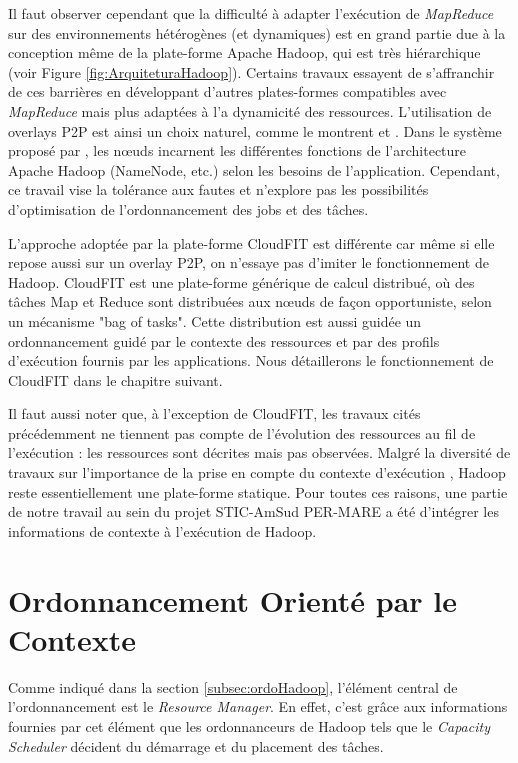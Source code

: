 Il faut observer cependant que la difficulté à adapter l'exécution de \textit{MapReduce} sur des environnements hétérogènes (et dynamiques) est en grand partie due à la conception même de la plate-forme Apache Hadoop, qui est très hiérarchique (voir Figure \ref{fig:ArquiteturaHadoop}). Certains travaux essayent de s'affranchir de ces barrières en développant d'autres plates-formes compatibles avec \textit{MapReduce} mais plus adaptées à l'a dynamicité des ressources.  L'utilisation de overlays P2P est ainsi un choix naturel, comme le montrent \cite{Marozzo2012} et \cite{Steffenel20151034}. Dans le système proposé par \cite{Marozzo2012}, les n{\oe}uds incarnent les différentes fonctions de l'architecture Apache Hadoop (NameNode, etc.) selon les besoins de l'application. Cependant, ce travail vise la tolérance aux fautes et n'explore pas les possibilités d'optimisation de l'ordonnancement des jobs et des tâches. 

L'approche adoptée par la plate-forme CloudFIT \cite{Steffenel20151034} est différente car même si elle repose aussi sur un overlay P2P, on n'essaye pas d'imiter le fonctionnement de Hadoop. CloudFIT est une plate-forme générique de calcul distribué, où des tâches Map et Reduce sont distribuées aux n{\oe}uds de façon opportuniste, selon un mécanisme "bag of tasks". Cette distribution est aussi guidée un ordonnancement guidé par le contexte des ressources et par des profils d'exécution fournis par les applications. Nous détaillerons le fonctionnement de CloudFIT dans le chapitre suivant.

Il faut aussi noter que, à l'exception de CloudFIT, les travaux cités précédemment ne tiennent pas compte de l'évolution des ressources au fil de l'exécution : les ressources sont décrites mais pas observées. Malgré la diversité de travaux sur l'importance de la prise en compte du contexte d'exécution \cite{Baldauf, Maamar, Ramakrishnan2014, Najar2015}, Hadoop reste essentiellement une plate-forme statique. Pour toutes ces raisons, une partie de notre travail au sein du projet STIC-AmSud PER-MARE a été d'intégrer les informations de contexte à l'exécution de Hadoop.

\section{Ordonnancement Orienté par le Contexte} \label{sec:desenv}

Comme indiqué dans la section \ref{subsec:ordoHadoop}, l'élément central de l'ordonnancement est le \textit{Resource Manager}. En effet, c'est grâce aux informations fournies par cet élément que les ordonnanceurs de Hadoop tels que le \textit{Capacity Scheduler} décident du démarrage et du placement des tâches. 

